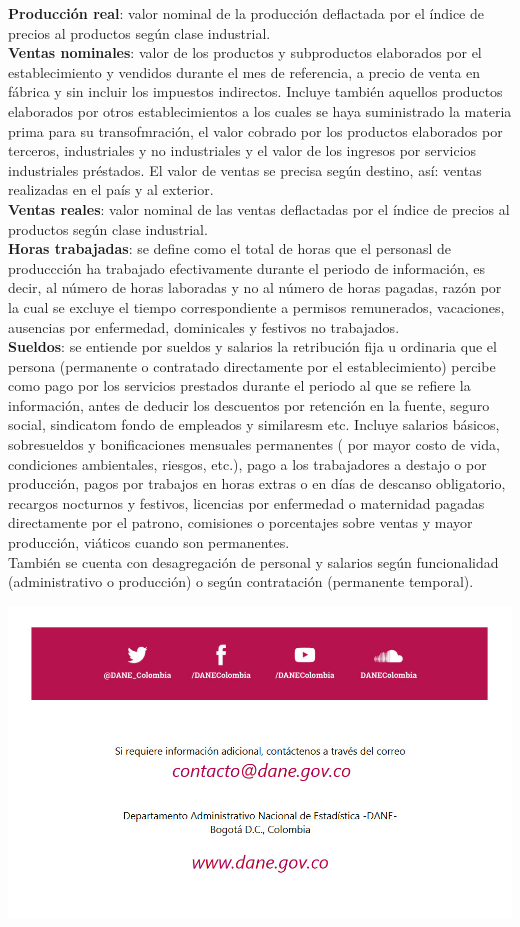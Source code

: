 \documentclass[
]{article}
\begin{document}
\textbf{Producción real}: valor nominal de la producción deflactada por
el índice de precios al productos según clase industrial.\\

\textbf{Ventas nominales}: valor de los productos y subproductos
elaborados por el establecimiento y vendidos durante el mes de
referencia, a precio de venta en fábrica y sin incluir los impuestos
indirectos. Incluye también aquellos productos elaborados por otros
establecimientos a los cuales se haya suministrado la materia prima para
su transofmración, el valor cobrado por los productos elaborados por
terceros, industriales y no industriales y el valor de los ingresos por
servicios industriales préstados. El valor de ventas se precisa según
destino, así: ventas realizadas en el país y al exterior.\\

\textbf{Ventas reales}: valor nominal de las ventas deflactadas por el
índice de precios al productos según clase industrial.\\

\textbf{Horas trabajadas}: se define como el total de horas que el
personasl de produccción ha trabajado efectivamente durante el periodo
de información, es decir, al número de horas laboradas y no al número de
horas pagadas, razón por la cual se excluye el tiempo correspondiente a
permisos remunerados, vacaciones, ausencias por enfermedad, dominicales
y festivos no trabajados.\\

\textbf{Sueldos}: se entiende por sueldos y salarios la retribución fija
u ordinaria que el persona (permanente o contratado directamente por el
establecimiento) percibe como pago por los servicios prestados durante
el periodo al que se refiere la información, antes de deducir los
descuentos por retención en la fuente, seguro social, sindicatom fondo
de empleados y similaresm etc. Incluye salarios básicos, sobresueldos y
bonificaciones mensuales permanentes ( por mayor costo de vida,
condiciones ambientales, riesgos, etc.), pago a los trabajadores a
destajo o por producción, pagos por trabajos en horas extras o en días
de descanso obligatorio, recargos nocturnos y festivos, licencias por
enfermedad o maternidad pagadas directamente por el patrono, comisiones
o porcentajes sobre ventas y mayor producción, viáticos cuando son
permanentes.\\

También se cuenta con desagregación de personal y salarios según
funcionalidad (administrativo o producción) o según contratación
(permanente temporal). \newpage

\includegraphics{img/infodane_1.png}
\end{document}
